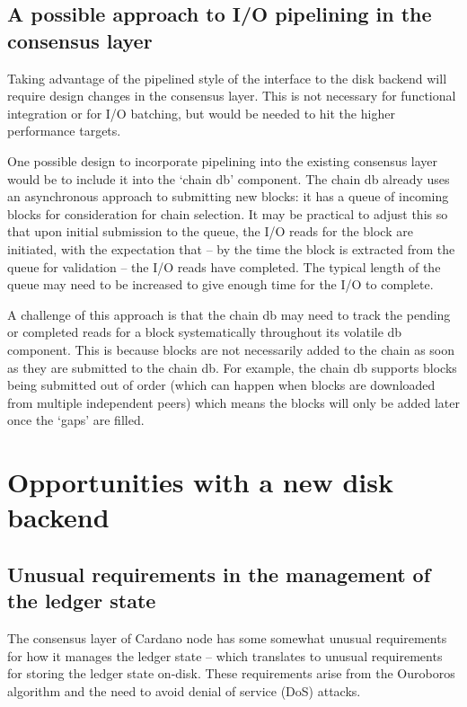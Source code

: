 \documentclass[11pt,a4paper]{article}
\begin{document}
\subsection{A possible approach to I/O pipelining in the consensus layer}
\label{sec:a-possible-approach-to-io-pipelining-in-the-consensus-layer}

Taking advantage of the pipelined style of the interface to the disk backend
will require design changes in the consensus layer. This is not necessary for
functional integration or for I/O batching, but would be needed to hit the
higher performance targets.

One possible design to incorporate pipelining into the existing consensus layer
would be to include it into the `chain db' component. The chain db already uses
an asynchronous approach to submitting new blocks: it has a queue of incoming
blocks for consideration for chain selection. It may be practical to adjust
this so that upon initial submission to the queue, the I/O reads for the block
are initiated, with the expectation that -- by the time the block is extracted
from the queue for validation -- the I/O reads have completed. The typical
length of the queue may need to be increased to give enough time for the I/O to
complete.

A challenge of this approach is that the chain db may need to track the pending
or completed reads for a block systematically throughout its volatile db
component. This is because blocks are not necessarily added to the chain as
soon as they are submitted to the chain db. For example, the chain db supports
blocks being submitted out of order (which can happen when blocks are
downloaded from multiple independent peers) which means the blocks will only be
added later once the `gaps' are filled.


\section{Opportunities with a new disk backend}
\label{sec:opportunities-with-a-new-disk-backend}

\subsection{Unusual requirements in the management of the ledger state}
\label{sec:unusual-requirements-in-the-management-of-the-ledger-state}

The consensus layer of Cardano node has some somewhat unusual requirements for
how it manages the ledger state -- which translates to unusual requirements for
storing the ledger state on-disk. These requirements arise from the Ouroboros
algorithm and the need to avoid denial of service (DoS) attacks.
\end{document}
